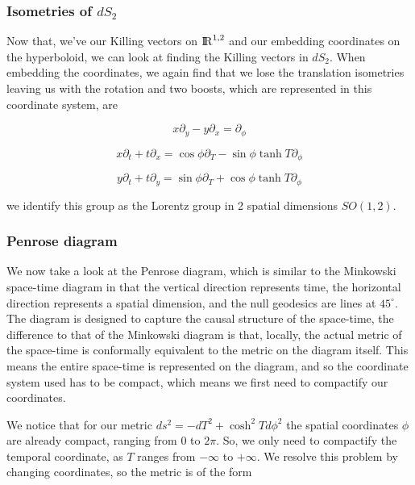 \documentclass[a4paper,11pt]{article}
\numberwithin{equation}{section}
\numberwithin{figure}{section}
\begin{document}
\begin{large}
\subsubsection{Isometries of $dS_2$}

Now that, we've our Killing vectors on ${\rm I\!R}^{1,2}$ and our embedding coordinates on the hyperboloid, we can look at finding the Killing vectors in $dS_2$. When embedding the coordinates, we again find that we lose the translation isometries leaving us with the rotation and two boosts, which are represented in this coordinate system, are


\begin{equation}
\label{eq:xyrot_dS}
x\partial_y-y\partial_x=\partial_\phi
\end{equation}


\begin{equation}
\label{eq:xboost}
x\partial_t+t\partial_x=\cos\phi \partial_T-\sin\phi\tanh T \partial_\phi
\end{equation}


\begin{equation}
\label{eq:yboost}
y\partial_t+t\partial_y=\sin\phi \partial_T+\cos\phi\tanh T\partial_\phi
\end{equation}

\vspace{0.5cm}

we identify this group as the Lorentz group in 2 spatial dimensions $SO(1,2)$.


\newpage


\subsubsection{Penrose diagram}

We now take a look at the Penrose diagram, which is similar to the Minkowski space-time diagram in that the vertical direction represents time, the horizontal direction represents a spatial dimension, and the null geodesics are lines at $45^{\circ}$. The diagram is designed to capture the causal structure of the space-time, the difference to that of the Minkowski diagram is that, locally, the actual metric of the space-time is conformally equivalent to the metric on the diagram itself. This means the entire space-time is represented on the diagram, and so the coordinate system used has to be compact, which means we first need to compactify our coordinates.

We notice that for our metric $ds^2=-dT^2+\cosh^2T d\phi^2$ the spatial coordinates $\phi$ are already compact, ranging from $0$ to $2\pi$. So, we only need to compactify the temporal coordinate, as $T$ ranges from $-\infty$ to $+\infty$. We resolve this problem by changing coordinates, so the metric is of the form \cite{hartman-lectures-dS,kim2002classical}


\end{large}
\end{document}
